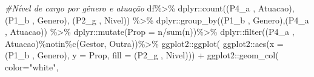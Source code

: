 \documentclass[
]{article}
\newenvironment{Shaded}{\begin{snugshade}}{\end{snugshade}}
\newcommand{\AttributeTok}[1]{\textcolor[rgb]{0.77,0.63,0.00}{#1}}
\newcommand{\CommentTok}[1]{\textcolor[rgb]{0.56,0.35,0.01}{\textit{#1}}}
\newcommand{\FunctionTok}[1]{\textcolor[rgb]{0.00,0.00,0.00}{#1}}
\newcommand{\NormalTok}[1]{#1}
\newcommand{\SpecialCharTok}[1]{\textcolor[rgb]{0.00,0.00,0.00}{#1}}
\newcommand{\StringTok}[1]{\textcolor[rgb]{0.31,0.60,0.02}{#1}}
\begin{document}
\begin{Shaded}
\begin{Highlighting}[]
\CommentTok{\#Nível de cargo por gênero e atuação}
\NormalTok{df}\SpecialCharTok{\%\textgreater{}\%}
\NormalTok{  dplyr}\SpecialCharTok{::}\FunctionTok{count}\NormalTok{(}\StringTok{\textasciigrave{}}\AttributeTok{(\textquotesingle{}P4\_a \textquotesingle{}, \textquotesingle{}Atuacao\textquotesingle{})}\StringTok{\textasciigrave{}}\NormalTok{,}\StringTok{\textasciigrave{}}\AttributeTok{(\textquotesingle{}P1\_b \textquotesingle{}, \textquotesingle{}Genero\textquotesingle{})}\StringTok{\textasciigrave{}}\NormalTok{, }\StringTok{\textasciigrave{}}\AttributeTok{(\textquotesingle{}P2\_g \textquotesingle{}, \textquotesingle{}Nivel\textquotesingle{})}\StringTok{\textasciigrave{}}\NormalTok{) }\SpecialCharTok{\%\textgreater{}\%}
\NormalTok{  dplyr}\SpecialCharTok{::}\FunctionTok{group\_by}\NormalTok{(}\StringTok{\textasciigrave{}}\AttributeTok{(\textquotesingle{}P1\_b \textquotesingle{}, \textquotesingle{}Genero\textquotesingle{})}\StringTok{\textasciigrave{}}\NormalTok{,}\StringTok{\textasciigrave{}}\AttributeTok{(\textquotesingle{}P4\_a \textquotesingle{}, \textquotesingle{}Atuacao\textquotesingle{})}\StringTok{\textasciigrave{}}\NormalTok{) }\SpecialCharTok{\%\textgreater{}\%}
\NormalTok{  dplyr}\SpecialCharTok{::}\FunctionTok{mutate}\NormalTok{(}\AttributeTok{Prop =}\NormalTok{ n}\SpecialCharTok{/}\FunctionTok{sum}\NormalTok{(n))}\SpecialCharTok{\%\textgreater{}\%}
\NormalTok{  dplyr}\SpecialCharTok{::}\FunctionTok{filter}\NormalTok{(}\StringTok{\textasciigrave{}}\AttributeTok{(\textquotesingle{}P4\_a \textquotesingle{}, \textquotesingle{}Atuacao\textquotesingle{})}\StringTok{\textasciigrave{}}\SpecialCharTok{\%notin\%}\FunctionTok{c}\NormalTok{(}\StringTok{\textquotesingle{}Gestor\textquotesingle{}}\NormalTok{, }\StringTok{\textquotesingle{}Outra\textquotesingle{}}\NormalTok{))}\SpecialCharTok{\%\textgreater{}\%}
\NormalTok{  ggplot2}\SpecialCharTok{::}\FunctionTok{ggplot}\NormalTok{(}
\NormalTok{    ggplot2}\SpecialCharTok{::}\FunctionTok{aes}\NormalTok{(}\AttributeTok{x =} \StringTok{\textasciigrave{}}\AttributeTok{(\textquotesingle{}P1\_b \textquotesingle{}, \textquotesingle{}Genero\textquotesingle{})}\StringTok{\textasciigrave{}}\NormalTok{, }\AttributeTok{y =}\NormalTok{ Prop,}
                 \AttributeTok{fill =} \StringTok{\textasciigrave{}}\AttributeTok{(\textquotesingle{}P2\_g \textquotesingle{}, \textquotesingle{}Nivel\textquotesingle{})}\StringTok{\textasciigrave{}}\NormalTok{)) }\SpecialCharTok{+}
\NormalTok{  ggplot2}\SpecialCharTok{::}\FunctionTok{geom\_col}\NormalTok{( }\AttributeTok{color=}\StringTok{"white"}\NormalTok{,}

\end{Highlighting}
\end{Shaded}
\end{document}
